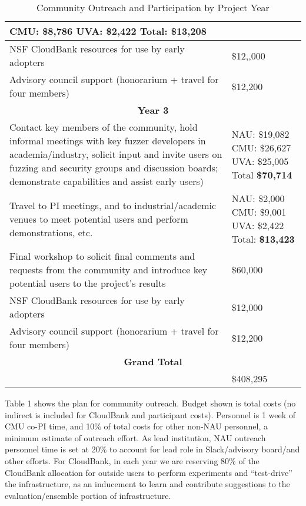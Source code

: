 \documentclass[12pt]{article}
\begin{document}
\begin{table}
\begin{tabular}{|p{12cm}|p{3cm}|}
                                                       CMU: \$8,786
                                                       UVA:  \$2,422
                                                       Total: \textbf{\$13,208}\\
    \hline
    NSF CloudBank resources for use by early adopters & \$12,,000 \\
    \hline 
    Advisory council support (honorarium + travel for four members) & \$12,200 \\    
    \hline
    \hline
    \multicolumn{2}{c}{{\bf Year 3}} \\
    \hline
    \hline
   Contact key members of the community, hold informal meetings with
    key fuzzer developers in academia/industry, solicit input and
    invite users
    on fuzzing and security groups and discussion boards; demonstrate
    capabilities and assist early users) &  NAU:   \$19,082 CMU: \$26,627 UVA: \$25,005
                                                      Total \textbf{\$70,714} \\
    \hline
    Travel to PI meetings, and to industrial/academic venues to meet
    potential users and perform demonstrations, etc. & NAU: \$2,000
                                                       CMU: \$9,001
                                                       UVA:  \$2,422
                                                       Total: \textbf{\$13,423}\\
    \hline    
    Final workshop to solicit final comments and requests from the
    community and introduce key potential users to the project’s
    results & \$60,000 \\
    \hline
    NSF CloudBank resources for use by early adopters & \$12,000 \\
    \hline 
    Advisory council support (honorarium + travel for four members) & \$12,200 \\    
    \hline
    \hline
    \multicolumn{2}{c}{{\bf Grand Total}} \\
    \hline
                   &     \$408,295 \\
                     \hline
 
  \end{tabular}
\label{outreach}
  \caption{Community Outreach and Participation by Project Year}
  
\end{table}


Table 1 shows the plan for community
outreach.   Budget shown is total costs 
 (no indirect is included for CloudBank and participant costs).   Personnel is 1 week of CMU co-PI time, and 10\%
of total costs for other non-NAU personnel, a
minimum estimate of outreach effort.  As lead institution, NAU
outreach personnel time is set at 20\% to account for lead role in
Slack/advisory board/and other efforts.  For CloudBank, in each year we
are reserving 80\% of the CloudBank allocation for outside users to
perform experiments and ``test-drive'' the infrastructure, as an
inducement to learn and contribute suggestions to the
evaluation/ensemble portion of infrastructure.
\end{document}
